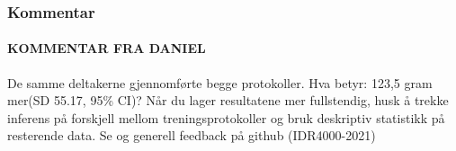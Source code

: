 \documentclass[
]{book}
\begin{document}
\hypertarget{kommentar}{%
\subsubsection{Kommentar}\label{kommentar}}

\hypertarget{kommentar-fra-daniel}{%
\paragraph{KOMMENTAR FRA DANIEL}\label{kommentar-fra-daniel}}

De samme deltakerne gjennomførte begge protokoller. Hva betyr: 123,5 gram mer(SD 55.17, 95\% CI)? Når du lager resultatene mer fullstendig, husk å trekke inferens på forskjell mellom treningsprotokoller og bruk deskriptiv statistikk på resterende data. Se og generell feedback på github (IDR4000-2021)

  
\end{document}
